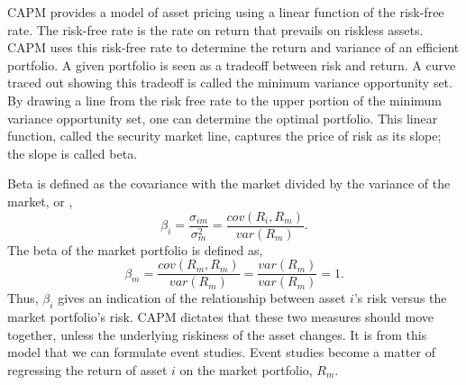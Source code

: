 CAPM provides a model of asset pricing using a linear
function of the risk-free rate.  The risk-free rate is the
rate on return that prevails on riskless assets.  CAPM uses
this risk-free rate to determine the return and variance of
an efficient portfolio.  A given portfolio is seen as a
tradeoff between risk and return.  A curve traced out
showing this tradeoff is called the minimum variance opportunity
set.
By drawing a line from the risk free rate to the upper
portion of the minimum variance opportunity set,
one can determine the optimal portfolio.  This linear
function, called the security market line, captures the
price of risk as its slope;  the slope is called beta.

Beta is defined as the covariance with the market divided by 
the variance of the market, or \cite[p. 198]{copeland},
\begin{equation}
\beta_{i}=\frac{\sigma_{im}}{\sigma_{m}^{2}}
=\frac{cov(R_{i},R_{m})}{var(R_{m})}.
\end{equation}
The beta of the market portfolio is defined
as,
\begin{equation}
\beta_{m}=\frac{cov(R_{m},R_{m})}{var(R_{m})}
=\frac{var(R_{m})}{var(R_{m})}=1.
\end{equation}
Thus, $\beta_{i}$ gives an indication of the relationship
between asset $i$'s risk versus the market portfolio's risk.
CAPM dictates that these two measures should move together,
unless the underlying riskiness of the asset changes.
It is from this model that we can formulate event studies. 
Event studies become a matter of regressing the return of
asset $i$ on the market portfolio, $R_{m}$.



